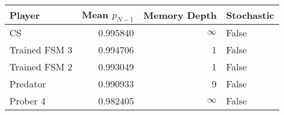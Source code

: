 \begin{tabular}{lrrl}
\toprule
        Player &  Mean $p_{N-1}$ &  Memory Depth & Stochastic \\
\midrule
            CS &        0.995840 &            \(\infty\) &      False \\
 Trained FSM 3 &        0.994706 &             1 &      False \\
 Trained FSM 2 &        0.993049 &             1 &      False \\
      Predator &        0.990933 &             9 &      False \\
      Prober 4 &        0.982405 &            \(\infty\) &      False \\
\bottomrule
\end{tabular}

